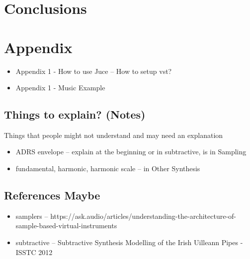 \documentclass[12pt]{article}
\begin{document}
	\section{Conclusions}
	
	\section{Appendix}
	\begin{itemize}
		\item Appendix 1 - How to use Juce -- How to setup vst?
		\item Appendix 1 - Music Example
	\end{itemize}

	\subsection{Things to explain? (Notes)}
	Things that people might not understand and may need an explanation
	\begin{itemize}
		\item ADRS envelope -- explain at the beginning or in subtractive, is in Sampling
		\item fundamental, harmonic, harmonic scale -- in Other Synthesis
	\end{itemize}

	\subsection{References Maybe}
	\begin{itemize}
		\item samplers -- https://ask.audio/articles/understanding-the-architecture-of-sample-based-virtual-instruments
		\item subtractive -- Subtractive Synthesis Modelling of the Irish Uilleann Pipes - ISSTC 2012
	\end{itemize}
	



	
\end{document}

